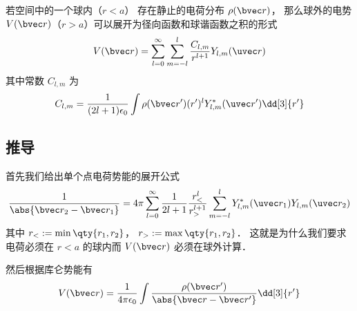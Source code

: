 
若空间中的一个球内（$r < a$） 存在静止的电荷分布 $\rho(\bvec r)$， 那么球外的电势 $V(\bvec r)$（$r > a$）可以展开为径向函数和球谐函数之积的形式
\begin{equation}
V(\bvec r) = \sum_{l = 0}^\infty \sum_{m = -l}^l \frac{C_{l,m}}{r^{l+1}} Y_{l,m}(\uvec r)
\end{equation}
其中常数 $C_{l,m}$ 为
\begin{equation}
C_{l,m} = \frac{1}{(2l+1)\epsilon_0} \int \rho(\bvec r') (r')^l Y_{l,m}^*(\uvec r') \dd[3]{r'}
\end{equation}

\subsection{推导}
首先我们给出单个点电荷势能的展开公式
\begin{equation}
\frac{1}{\abs{\bvec r_2 - \bvec r_1}} = 4\pi \sum_{l=0}^{\infty} \frac{1}{2l+1} \frac{r_<^l}{r_>^{l+1}} \sum_{m = -l}^l Y_{l,m}^*(\uvec r_1) Y_{l,m}(\uvec r_2)
\end{equation}
其中 $r_< := \min\qty{r_1, r_2}$， $r_> := \max\qty{r_1, r_2}$． 这就是为什么我们要求电荷必须在 $r < a$ 的球内而 $V(\bvec r)$ 必须在球外计算．

然后根据库仑势能有
\begin{equation}
V(\bvec r) = \frac{1}{4\pi\epsilon_0}\int \frac{\rho(\bvec r')}{\abs{\bvec r - \bvec r'}} \dd[3]{r'}
\end{equation}
